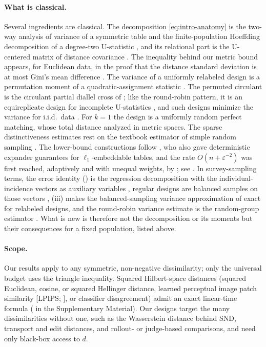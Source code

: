 \documentclass[twoside,11pt]{article}
\begin{document}
\paragraph{What is classical.}
Several ingredients are classical. The decomposition
\eqref{eq:intro-anatomy} is the two-way analysis of variance of a
symmetric table \citep{griffing1956concept} and the finite-population
Hoeffding decomposition of a degree-two U-statistic
\citep{nandi1963properties,bloznelis2001orthogonal}, and its relational
part is the U-centered matrix of distance covariance
\citep{szekely2014partial}. The inequality behind our metric bound appears,
for Euclidean data, in the proof that the distance standard deviation is at
most Gini's mean difference \citep{edelmann2020distance}. The variance of a
uniformly relabeled design is a
permutation moment of a quadratic-assignment statistic
\citep{mantel1967detection}. The permuted circulant is the circulant partial
diallel cross of \citet{kempthorne1961partial}; like the round-robin
pattern, it is an equireplicate design for incomplete U-statistics
\citep{lee1982incomplete,miglioli2025incomplete}, and such designs minimize
the variance for i.i.d.\ data \citep{blom1976some,lee1982incomplete}. For
$k=1$ the design is a uniformly random perfect matching, whose total
distance \citet{chang2017metric} analyzed in metric spaces. The sparse distinctiveness
estimates rest on the textbook estimator of simple random sampling
\citep{cochran1977sampling}. The
lower-bound constructions follow \citet{barhum2007approximating}, who also gave
deterministic expander guarantees for $\ell_1$-embeddable tables, and the rate
$O(n+\varepsilon^{-2})$ was first reached, adaptively and with unequal weights,
by \citet{chechik2015average}; see . In survey-sampling
terms, the error identity () is the regression
decomposition with the individual-incidence vectors as auxiliary variables
\citep{sarndal1992model}, regular designs are balanced samples on those
vectors \citep{deville2004efficient}, (iii) makes the
balanced-sampling variance approximation of \citet{deville2005variance}
exact for relabeled designs, and the round-robin variance estimate is the
random-group estimator \citep{wolter2007introduction}. What is new is
therefore not the decomposition or its moments but their consequences for a
fixed population, listed above.

\paragraph{Scope.}
Our results apply to any symmetric, non-negative dissimilarity; only the
universal budget uses the triangle inequality. Squared Hilbert-space
distances (squared Euclidean, cosine, or squared Hellinger distance, learned
perceptual image patch similarity [LPIPS; \citealp{zhang2018unreasonable}],
or classifier disagreement) admit an exact linear-time formula
( in the Supplementary Material). Our designs target the
many dissimilarities without one, such as the Wasserstein distance behind
SND, transport and edit distances, and rollout- or judge-based comparisons,
and need only black-box access to $d$.
\end{document}
